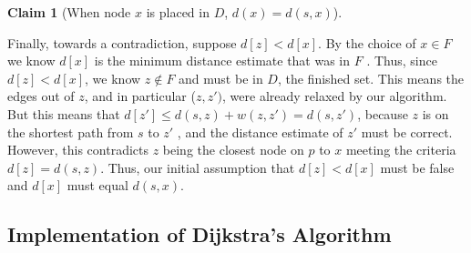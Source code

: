 \documentclass [12pt]{article}
\theoremstyle{definition}
\newtheorem{claim}{Claim}
\begin{document}
\begin{claim}[When node $x$ is placed in $D$, $d(x) = d(s,x)$]
\begin{enumerate}
    Finally, towards a contradiction, suppose $d[z] < d[x]$. By the choice of $x \in F$ we know $d[x]$ is the minimum distance estimate that was in $F$ . Thus, since $d[z] < d[x]$, we know $z \notin F$ and must be in $D$, the finished set. This means the edges out of $z$, and in particular ($z, z' )$, were already relaxed by our algorithm. But this means that $d[z ' ] \leq d(s, z) + w(z, z' ) = d(s, z' )$, because $z$ is on the shortest path from $s$ to $z '$ , and the distance estimate of $z '$ must be correct. However, this contradicts $z$ being the closest node on $p$ to $x$ meeting the criteria$ d[z] = d(s, z)$. Thus, our initial assumption that $d[z] < d[x]$ must be false and $d[x]$ must equal $d(s, x)$.
\end{enumerate}
\end{claim}


\subsection{Implementation of Dijkstra's Algorithm}
\end{document}
